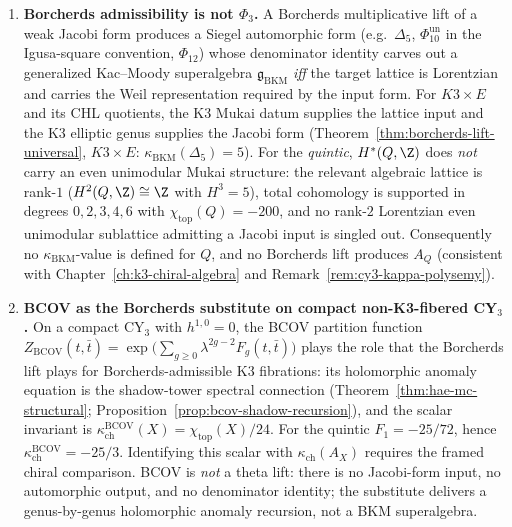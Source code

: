 \begin{remark}
\begin{enumerate}[label=\textup{(\alph*)}]
 \item \textbf{Borcherds admissibility is not $\Phi_3$.} A Borcherds multiplicative lift of a weak Jacobi form produces a Siegel automorphic form (e.g.\ $\Delta_5$, $\Phi_{10}^{\mathrm{un}}$ in the Igusa-square convention, $\Phi_{12}$) whose denominator identity carves out a generalized Kac--Moody superalgebra $\mathfrak{g}_{\mathrm{BKM}}$ \emph{iff} the target lattice is Lorentzian and carries the Weil representation required by the input form. For \(K3\times E\) and its CHL quotients, the K3 Mukai datum supplies the lattice input and the K3 elliptic genus supplies the Jacobi form (Theorem~\ref{thm:borcherds-lift-universal}, $K3 \times E$: $\kappa_{\mathrm{BKM}}(\Delta_5) = 5$). For the \emph{quintic}, $H^*(Q, \Z)$ does \emph{not} carry an even unimodular Mukai structure: the relevant algebraic lattice is rank-$1$ ($H^2(Q, \Z) \cong \Z$ with $H^3 = 5$), total cohomology is supported in degrees $0, 2, 3, 4, 6$ with $\chi_{\mathrm{top}}(Q) = -200$, and no rank-$2$ Lorentzian even unimodular sublattice admitting a Jacobi input is singled out. Consequently no \(\kappa_{\mathrm{BKM}}\)-value is defined for \(Q\), and no Borcherds lift produces \(A_Q\) (consistent with Chapter~\ref{ch:k3-chiral-algebra} and Remark~\ref{rem:cy3-kappa-polysemy}).
 \item \textbf{BCOV as the Borcherds substitute on compact non-K3-fibered CY$_3$.} On a compact CY$_3$ with $h^{1,0}=0$, the BCOV partition function $Z_{\mathrm{BCOV}}(t,\bar t)=\exp\bigl(\sum_{g\geq0}\lambda^{2g-2}F_g(t,\bar t)\bigr)$ plays the role that the Borcherds lift plays for Borcherds-admissible K3 fibrations: its holomorphic anomaly equation is the shadow-tower spectral connection (Theorem~\ref{thm:hae-mc-structural}; Proposition~\ref{prop:bcov-shadow-recursion}), and the scalar invariant is $\kappa_{\mathrm{ch}}^{\mathrm{BCOV}}(X)=\chi_{\mathrm{top}}(X)/24$. For the quintic $F_1=-25/72$, hence $\kappa_{\mathrm{ch}}^{\mathrm{BCOV}}=-25/3$. Identifying this scalar with $\kappa_{\mathrm{ch}}(A_X)$ requires the framed chiral comparison. BCOV is \emph{not} a theta lift: there is no Jacobi-form input, no automorphic output, and no denominator identity; the substitute delivers a genus-by-genus holomorphic anomaly recursion, not a BKM superalgebra.

\end{enumerate}
\end{remark}
